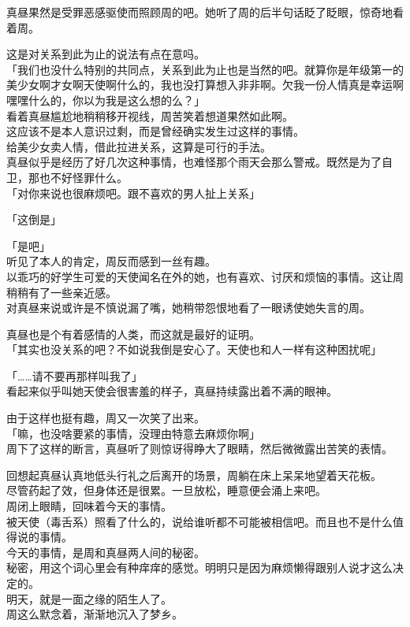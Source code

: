 真昼果然是受罪恶感驱使而照顾周的吧。她听了周的后半句话眨了眨眼，惊奇地看着周。

这是对关系到此为止的说法有点在意吗。\\

「我们也没什么特别的共同点，关系到此为止也是当然的吧。就算你是年级第一的美少女啊才女啊天使啊什么的，我也没打算想入非非啊。欠我一份人情真是幸运啊嘿嘿什么的，你以为我是这么想的么？」\\

看着真昼尴尬地稍稍移开视线，周苦笑着想道果然如此啊。\\

这应该不是本人意识过剩，而是曾经确实发生过这样的事情。\\

给美少女卖人情，借此拉进关系，这算是可行的手法。\\

真昼似乎是经历了好几次这种事情，也难怪那个雨天会那么警戒。既然是为了自卫，那也不好怪罪什么。\\

「对你来说也很麻烦吧。跟不喜欢的男人扯上关系」

「这倒是」

「是吧」\\

听见了本人的肯定，周反而感到一丝有趣。\\

以乖巧的好学生可爱的天使闻名在外的她，也有喜欢、讨厌和烦恼的事情。这让周稍稍有了一些亲近感。\\

对真昼来说或许是不慎说漏了嘴，她稍带怨恨地看了一眼诱使她失言的周。

真昼也是个有着感情的人类，而这就是最好的证明。\\

「其实也没关系的吧？不如说我倒是安心了。天使也和人一样有这种困扰呢」

「……请不要再那样叫我了」\\

看起来似乎叫她天使会很害羞的样子，真昼持续露出着不满的眼神。

由于这样也挺有趣，周又一次笑了出来。\\

「嘛，也没啥要紧的事情，没理由特意去麻烦你啊」\\

周下了这样的断言，真昼听了则惊讶得睁大了眼睛，然后微微露出苦笑的表情。\\

\vspace{2\baselineskip}

回想起真昼认真地低头行礼之后离开的场景，周躺在床上呆呆地望着天花板。\\

尽管药起了效，但身体还是很累。一旦放松，睡意便会涌上来吧。\\

周闭上眼睛，回味着今天的事情。\\

被天使（毒舌系）照看了什么的，说给谁听都不可能被相信吧。而且也不是什么值得说的事情。\\

今天的事情，是周和真昼两人间的秘密。\\

秘密，用这个词心里会有种痒痒的感觉。明明只是因为麻烦懒得跟别人说才这么决定的。\\

明天，就是一面之缘的陌生人了。\\

周这么默念着，渐渐地沉入了梦乡。
